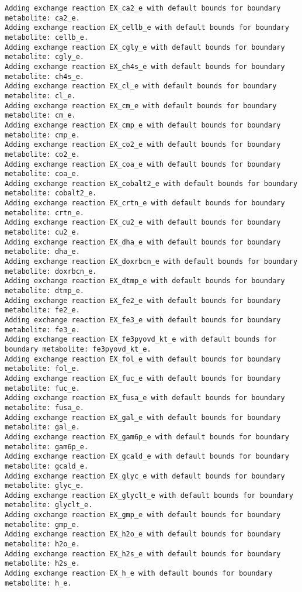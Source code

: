 \documentclass[
  letterpaper,
  DIV=11,
  numbers=noendperiod]{scrartcl}
\begin{document}
\begin{verbatim}
Adding exchange reaction EX_ca2_e with default bounds for boundary metabolite: ca2_e.
Adding exchange reaction EX_cellb_e with default bounds for boundary metabolite: cellb_e.
Adding exchange reaction EX_cgly_e with default bounds for boundary metabolite: cgly_e.
Adding exchange reaction EX_ch4s_e with default bounds for boundary metabolite: ch4s_e.
Adding exchange reaction EX_cl_e with default bounds for boundary metabolite: cl_e.
Adding exchange reaction EX_cm_e with default bounds for boundary metabolite: cm_e.
Adding exchange reaction EX_cmp_e with default bounds for boundary metabolite: cmp_e.
Adding exchange reaction EX_co2_e with default bounds for boundary metabolite: co2_e.
Adding exchange reaction EX_coa_e with default bounds for boundary metabolite: coa_e.
Adding exchange reaction EX_cobalt2_e with default bounds for boundary metabolite: cobalt2_e.
Adding exchange reaction EX_crtn_e with default bounds for boundary metabolite: crtn_e.
Adding exchange reaction EX_cu2_e with default bounds for boundary metabolite: cu2_e.
Adding exchange reaction EX_dha_e with default bounds for boundary metabolite: dha_e.
Adding exchange reaction EX_doxrbcn_e with default bounds for boundary metabolite: doxrbcn_e.
Adding exchange reaction EX_dtmp_e with default bounds for boundary metabolite: dtmp_e.
Adding exchange reaction EX_fe2_e with default bounds for boundary metabolite: fe2_e.
Adding exchange reaction EX_fe3_e with default bounds for boundary metabolite: fe3_e.
Adding exchange reaction EX_fe3pyovd_kt_e with default bounds for boundary metabolite: fe3pyovd_kt_e.
Adding exchange reaction EX_fol_e with default bounds for boundary metabolite: fol_e.
Adding exchange reaction EX_fuc_e with default bounds for boundary metabolite: fuc_e.
Adding exchange reaction EX_fusa_e with default bounds for boundary metabolite: fusa_e.
Adding exchange reaction EX_gal_e with default bounds for boundary metabolite: gal_e.
Adding exchange reaction EX_gam6p_e with default bounds for boundary metabolite: gam6p_e.
Adding exchange reaction EX_gcald_e with default bounds for boundary metabolite: gcald_e.
Adding exchange reaction EX_glyc_e with default bounds for boundary metabolite: glyc_e.
Adding exchange reaction EX_glyclt_e with default bounds for boundary metabolite: glyclt_e.
Adding exchange reaction EX_gmp_e with default bounds for boundary metabolite: gmp_e.
Adding exchange reaction EX_h2o_e with default bounds for boundary metabolite: h2o_e.
Adding exchange reaction EX_h2s_e with default bounds for boundary metabolite: h2s_e.
Adding exchange reaction EX_h_e with default bounds for boundary metabolite: h_e.

\end{verbatim}
\end{document}
